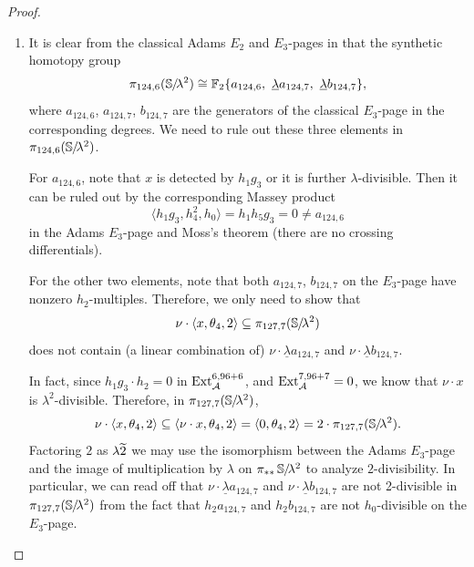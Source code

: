 \begin{proof}
\begin{enumerate}
From , we know that on the classical Adams $E_2$-page
$$\Ext_{\A}^{s, 123+s} = 0 \ \text{for} \ s \leq 7,$$
$$\Ext_{\A}^{s, 124+s} = 0 \ \text{for} \ s \leq 5.$$
These facts means that synthetically $\pi_{123, 7}\Ss$ contains no non-trivial $\lambda$-torsion elements. Therefore, we must have $x \cdot \theta_4 = 0$ in $\pi_{123,7}\Ss$.\vspace{4pt} 
\item It is clear from the classical Adams $E_2$ and $E_3$-pages in  that the synthetic homotopy group 
$$\pi_{124, 6}(\operatorname{\mathbb{S}}\hspace{-2.2pt}/\!\lambda^2) \cong \operatorname{\mathbb{F}}_2\{a_{124, 6}, \ \underline{\lambda} a_{124, 7}, \ \underline{\lambda} b_{124, 7}\},$$ 
where $a_{124, 6}$, $a_{124, 7}$, $b_{124, 7}$ are the generators of the classical $E_3$-page in the corresponding degrees. We need to rule out these three elements in $\pi_{124, 6}(\operatorname{\mathbb{S}}\hspace{-2.2pt}/\!\lambda^2)$.

For $a_{124, 6}$, note that $x$ is detected by $h_1g_3$ or it is further $\lambda$-divisible. Then it can be ruled out by the corresponding Massey product 
$$\langle h_1g_3, h_4^2, h_0 \rangle = h_1h_5g_3 = 0 \neq a_{124,6} $$ 
in the Adams $E_3$-page and Moss's theorem (there are no crossing differentials).

For the other two elements, note that both $a_{124, 7}$, $b_{124, 7}$ on the $E_3$-page have nonzero $h_2$-multiples. Therefore, we only need to show that 
$$\nu \cdot \langle x, \theta_4, 2 \rangle \subseteq \pi_{127, 7}(\operatorname{\mathbb{S}}\hspace{-2.2pt}/\!\lambda^2)$$ 
does not contain (a linear combination of) $\nu \cdot \underline{\lambda} a_{124, 7}$ and $\nu \cdot \underline{\lambda} b_{124, 7}$.

In fact, since $h_1g_3 \cdot h_2 = 0$ in $\operatorname{\mathrm{Ext}}_{\operatorname{\mathcal{A}}}^{6, 96+6}$, and $\operatorname{\mathrm{Ext}}_{\operatorname{\mathcal{A}}}^{7, 96+7} = 0$, we know that $\nu \cdot x$ is $\lambda^2$-divisible. Therefore, in $\pi_{127, 7}(\operatorname{\mathbb{S}}\hspace{-2.2pt}/\!\lambda^2)$, 
$$\nu \cdot \langle x, \theta_4, 2 \rangle \subseteq  \langle \nu \cdot x, \theta_4, 2 \rangle = \langle 0, \theta_4, 2 \rangle = 2 \cdot \pi_{127, 7}(\operatorname{\mathbb{S}}\hspace{-2.2pt}/\!\lambda^2).$$
Factoring $2$ as $\lambda \wt{2}$ we may use the isomorphism between the Adams $E_3$-page and the image of multiplication by $\lambda$ on $\pi_{**}\operatorname{\mathbb{S}}\hspace{-2.2pt}/\!\lambda^2$ to analyze $2$-divisibility.
In particular, we can read off that $\nu \cdot \underline{\lambda} a_{124, 7}$ and $\nu \cdot \underline{\lambda} b_{124, 7}$ are not 2-divisible in $\pi_{127, 7}(\operatorname{\mathbb{S}}\hspace{-2.2pt}/\!\lambda^2)$
from the fact that $h_2a_{124,7}$ and $h_2b_{124,7}$ are not $h_0$-divisible on the $E_3$-page.\vspace{4pt}


\end{enumerate}
\end{proof}
